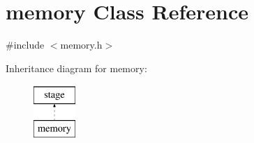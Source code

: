 \hypertarget{classmemory}{
\section{memory Class Reference}
\label{classmemory}
}


{\ttfamily \#include $<$memory.h$>$}

Inheritance diagram for memory:\begin{figure}[H]
\begin{center}
\leavevmode
\includegraphics[height=2.000000cm]{classmemory}
\end{center}
\end{figure}

